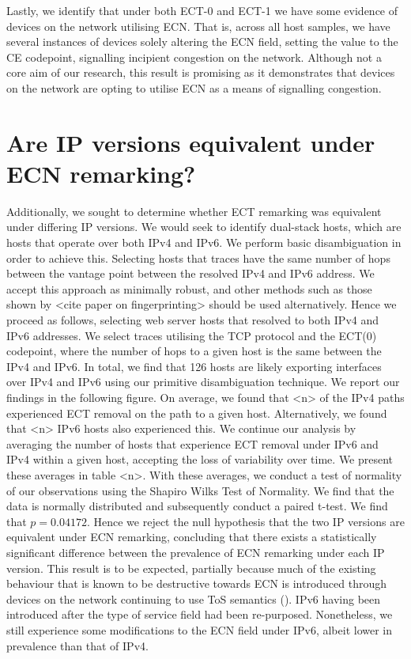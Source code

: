 \documentclass{l4proj}
\begin{document}
Lastly, we identify that under both ECT-0 and ECT-1 we have some evidence of devices on the network utilising ECN. That is, across all host samples, we have several instances of devices solely altering the ECN field, setting the value to the CE codepoint, signalling incipient congestion on the network. Although not a core aim of our research, this result is promising as it demonstrates that devices on the network are opting to utilise ECN as a means of signalling congestion.


\section{Are IP versions equivalent under ECN remarking?}

Additionally, we sought to determine whether ECT remarking was equivalent under differing IP versions. We would seek to identify dual-stack hosts, which are hosts that operate over both IPv4 and IPv6. We perform basic disambiguation in order to achieve this. Selecting hosts that traces have the same number of hops between the vantage point between the resolved IPv4 and IPv6 address. We accept this approach as minimally robust, and other methods such as those shown by <cite paper on fingerprinting> should be used alternatively. Hence we proceed as follows, selecting web server hosts that resolved to both IPv4 and IPv6 addresses. We select traces utilising the TCP protocol and the ECT(0) codepoint, where the number of hops to a given host is the same between the IPv4 and IPv6. In total, we find that 126 hosts are likely exporting interfaces over IPv4 and IPv6 using our primitive disambiguation technique. We report our findings in the following figure. On average, we found that <n> of the IPv4 paths experienced ECT removal on the path to a given host. Alternatively, we found that <n> IPv6 hosts also experienced this. We continue our analysis by averaging the number of hosts that experience ECT removal under IPv6 and IPv4 within a given host, accepting the loss of variability over time. We present these averages in table <n>. With these averages, we conduct a test of normality of our observations using the Shapiro Wilks Test of Normality. We find that the data is normally distributed and subsequently conduct a paired t-test. We find that $ p=0.04172 $. Hence we reject the null hypothesis that the two IP versions are equivalent under ECN remarking, concluding that there exists a statistically significant difference between the prevalence of ECN remarking under each IP version. This result is to be expected, partially because much of the existing behaviour that is known to be destructive towards ECN is introduced through devices on the network continuing to use ToS semantics (\cite{custura_exploring_2018}). IPv6 having been introduced after the type of service field had been re-purposed. Nonetheless, we still experience some modifications to the ECN field under IPv6, albeit lower in prevalence than that of IPv4.
\end{document}
